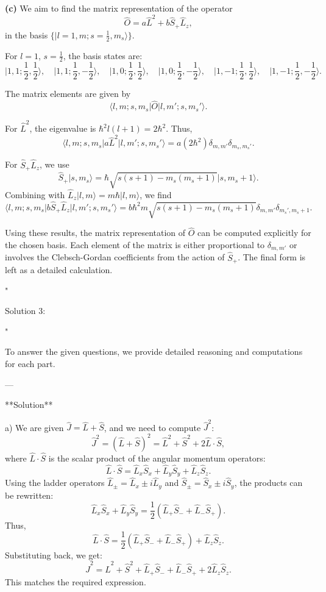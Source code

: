 \textbf{(c)}  
We aim to find the matrix representation of the operator  
\[
\hat{O} = a \hat{L}^2 + b \hat{S}_+ \hat{L}_z,
\]  
in the basis $\{ \lvert l = 1, m; s = \frac{1}{2}, m_s \rangle \}$.  

For $l=1$, $s = \frac{1}{2}$, the basis states are:  
\[
\lvert 1, 1; \frac{1}{2}, \frac{1}{2} \rangle, \quad \lvert 1, 1; \frac{1}{2}, -\frac{1}{2} \rangle, \quad \lvert 1, 0; \frac{1}{2}, \frac{1}{2} \rangle, \quad \lvert 1, 0; \frac{1}{2}, -\frac{1}{2} \rangle, \quad \lvert 1, -1; \frac{1}{2}, \frac{1}{2} \rangle, \quad \lvert 1, -1; \frac{1}{2}, -\frac{1}{2} \rangle.
\]  

The matrix elements are given by  
\[
\langle l, m; s, m_s \rvert \hat{O} \lvert l, m'; s, m_s' \rangle.
\]  

For $\hat{L}^2$, the eigenvalue is $\hbar^2 l(l+1) = 2\hbar^2$. Thus,  
\[
\langle l, m; s, m_s \rvert a \hat{L}^2 \lvert l, m'; s, m_s' \rangle = a (2\hbar^2) \delta_{m,m'} \delta_{m_s,m_s'}.
\]  

For $\hat{S}_+ \hat{L}_z$, we use  
\[
\hat{S}_+ \lvert s, m_s \rangle = \hbar \sqrt{s(s+1) - m_s(m_s+1)} \lvert s, m_s+1 \rangle.
\]  
Combining with $\hat{L}_z \lvert l, m \rangle = m\hbar \lvert l, m \rangle$, we find  
\[
\langle l, m; s, m_s \rvert b \hat{S}_+ \hat{L}_z \lvert l, m'; s, m_s' \rangle = b \hbar^2 m \sqrt{s(s+1) - m_s(m_s+1)} \delta_{m,m'} \delta_{m_s', m_s+1}.
\]  

Using these results, the matrix representation of $\hat{O}$ can be computed explicitly for the chosen basis. Each element of the matrix is either proportional to $\delta_{m,m'}$ or involves the Clebsch-Gordan coefficients from the action of $\hat{S}_+$. The final form is left as a detailed calculation.

"

Solution 3:

"

To answer the given questions, we provide detailed reasoning and computations for each part.

---

**Solution**

a) We are given $\hat{J} = \hat{L} + \hat{S}$, and we need to compute $\hat{J}^2$:
\[
\hat{J}^2 = (\hat{L} + \hat{S})^2 = \hat{L}^2 + \hat{S}^2 + 2 \hat{L} \cdot \hat{S},
\]
where $\hat{L} \cdot \hat{S}$ is the scalar product of the angular momentum operators:
\[
\hat{L} \cdot \hat{S} = \hat{L}_x \hat{S}_x + \hat{L}_y \hat{S}_y + \hat{L}_z \hat{S}_z.
\]
Using the ladder operators $\hat{L}_\pm = \hat{L}_x \pm i\hat{L}_y$ and $\hat{S}_\pm = \hat{S}_x \pm i\hat{S}_y$, the products can be rewritten:
\[
\hat{L}_x \hat{S}_x + \hat{L}_y \hat{S}_y = \frac{1}{2} (\hat{L}_+ \hat{S}_- + \hat{L}_- \hat{S}_+).
\]
Thus,
\[
\hat{L} \cdot \hat{S} = \frac{1}{2} (\hat{L}_+ \hat{S}_- + \hat{L}_- \hat{S}_+) + \hat{L}_z \hat{S}_z.
\]
Substituting back, we get:
\[
\hat{J}^2 = \hat{L}^2 + \hat{S}^2 + \hat{L}_+ \hat{S}_- + \hat{L}_- \hat{S}_+ + 2 \hat{L}_z \hat{S}_z.
\]
This matches the required expression.

